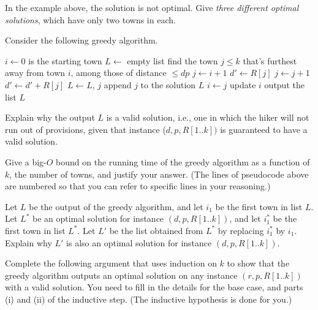 \documentclass[11pt,fleqn]{exam}
\begin{document}
\begin{questions}
\question[3]
In the example above, the solution is not optimal. Give {\em three
different optimal solutions}, which have only two towns in each.

\clearpage
\question[2]
Consider the following greedy algorithm.

\vspace{.1in}

\begin{algorithmic}[1]
\State $i \leftarrow 0$  is the starting town
\State $L \leftarrow$ empty list
\State
   \Comment find the town $j \le k$ that's furthest away from town $i$, among those of distance $\le dp$
   \State   $j \leftarrow i+1$
   \State   $d' \leftarrow R[j]$
         \State      $j \leftarrow j+1$
         \State      $d' \leftarrow d' + R[j]$
         \EndWhile
      \State $L \leftarrow L$, $j$ \Comment append $j$ to the solution $L$
      \EndIf
   \State $i \leftarrow j$ \Comment update $i$
\EndWhile
\State output the list $L$
\EndProcedure
\end{algorithmic}
Explain why the output $L$ is a valid solution, i.e., one in which the hiker will
not run out of provisions, given that instance ($d,p,R[1..k])$ is 
guaranteed to have a valid solution.

\question[3]
Give a big-$O$ bound on the running time of the greedy algorithm as a function of $k$, the number of towns, and justify your answer. (The lines of pseudocode above are numbered so that you can refer to specific lines in your reasoning.)

\clearpage
\question[3]
Let $L$ be the output of the greedy algorithm, and let $i_1$ be the
first town in list $L$.  Let $L^*$ be an optimal solution for instance
$(d,p,R[1..k])$, and let $i_1^*$ be the first town in list $L^*$.  Let
$L'$ be the list obtained from $L^*$ by replacing $i_1^*$ by $i_1$.
Explain why $L'$ is also an optimal solution for instance
$(d,p,R[1..k])$.

\question[3]
Complete the following argument that uses induction on $k$ to show that the greedy algorithm
outputs an optimal solution
 on any instance $(r,p,R[1..k])$ with a valid solution. You need to fill in the details for 
the base case, and parts (i) and (ii) of the inductive step. (The inductive hypothesis is done for you.)

\vspace{.1in}


\end{questions}
\end{document}
